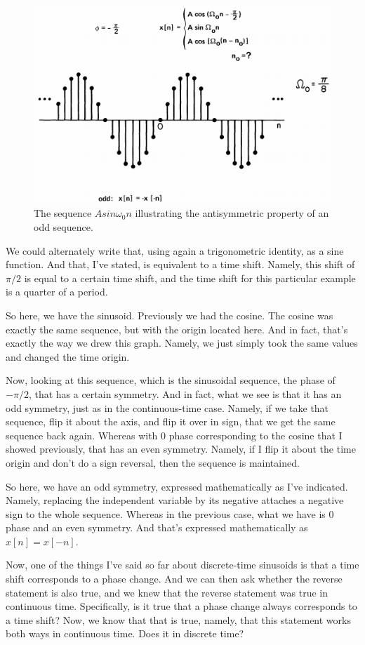 \documentclass[fleqn,10pt]{olplainarticle}
\theoremstyle{definition}
\theoremstyle{remark}
\begin{document}
\begin{figure}[ht]
	\centering
	\includegraphics[width=0.6\linewidth]{images/signals_08.png}
	\caption{The sequence $A sin \omega_0 n$ illustrating the antisymmetric property of an odd sequence.}
	\label{fig:signals_08}
\end{figure}

We could alternately write that, using again a trigonometric identity, as a sine function. And that, I've stated, is equivalent to a time shift. Namely, this shift of $ \pi/2$ is equal to a certain time shift, and the time shift for this particular example is a quarter of a period.

So here, we have the sinusoid. Previously we had the cosine. The cosine was exactly the same sequence, but with the origin located here. And in fact, that's exactly the way we drew this graph. Namely, we just simply took the same values and changed the time origin.

Now, looking at this sequence, which is the sinusoidal sequence, the phase of $-\pi/2$, that has a certain symmetry. And in fact, what we see is that it has an odd symmetry, just as in the continuous-time case. Namely, if we take that sequence, flip it about the axis, and flip it over in sign, that we get the same sequence back again. Whereas with 0 phase corresponding to the cosine that I showed previously, that has an even symmetry. Namely, if I flip it about the time origin and don't do a sign reversal, then the sequence is maintained.

So here, we have an odd symmetry, expressed mathematically as I've indicated. Namely, replacing the independent variable by its negative attaches a negative sign to the whole sequence. Whereas in the previous case, what we have is 0 phase and an even symmetry. And that's expressed mathematically as $x[n] = x[-n]$.

Now, one of the things I've said so far about discrete-time sinusoids is that a time shift corresponds to a phase change. And we can then ask whether the reverse statement is also true, and we knew that the reverse statement was true in continuous time. Specifically, is it true that a phase change always corresponds to a time shift? Now, we know that that is true, namely, that this statement works both ways in continuous time. Does it in discrete time?
\end{document}
